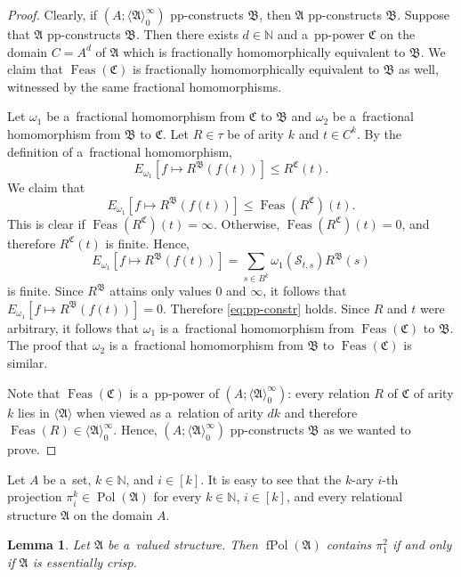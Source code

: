 \documentclass[preprint,12pt]{elsarticle}
\newcommand{\N}{\mathbb N}
\newcommand{\bA}{{\mathfrak A}}
\newcommand{\bB}{{\mathfrak B}}
\newcommand{\bC}{{\mathfrak C}}
\DeclareMathOperator{\fPol}{fPol}
\DeclareMathOperator{\Pol}{Pol}
\DeclareMathOperator{\Feas}{Feas}
\newtheorem{lemma}[theorem]{Lemma}
\begin{document}
\begin{proof}
Clearly, if $(A; \langle \bA \rangle_0^\infty)$ pp-constructs $\bB$, then $\bA$ pp-constructs $\bB$. Suppose that $\bA$ pp-constructs $\bB$. Then there exists $d\in \N$ and a~pp-power $\bC$ on the domain $C=A^d$ of $\bA$ which is fractionally homomorphically equivalent to $\bB$. We claim that $\Feas(\bC)$ is fractionally homomorphically equivalent to $\bB$ as well, witnessed by the same fractional homomorphisms.

Let $\omega_1$ be a~fractional homomorphism from $\bC$ to $\bB$ and $\omega_2$ be a~fractional homomorphism from $\bB$ to $\bC$. Let $R \in \tau$ be of arity $k$ and $t \in C^k$. By the definition of a~fractional homomorphism,
\[E_{\omega_1}[f \mapsto R^{\bB}(f(t))] \leq R^{\bC}(t).\]
We claim that 
\begin{equation}
E_{\omega_1}[f \mapsto R^{\bB}(f(t))] \leq \Feas(R^{\bC})(t). \label{eq:pp-constr}
\end{equation}
This is clear if $\Feas(R^{\bC})(t)=\infty$. Otherwise, $\Feas(R^{\bC})(t)=0$, and therefore $R^{\bC}(t)$ is finite. Hence, 
\[E_{\omega_1}[f \mapsto R^{\bB}(f(t))] = \sum_{s \in B^k} \omega_1(\mathscr{S}_{t,s}) R^{\bB}(s)\]
is finite. 
Since $R^{\bB}$ attains only values $0$ and $\infty$, it follows that $E_{\omega_1}[f \mapsto R^{\bB}(f(t))]=0$. Therefore \eqref{eq:pp-constr} holds. Since $R$ and $t$ were arbitrary, it follows that $\omega_1$ is a~fractional homomorphism from $\Feas(\bC)$ to $\bB$. The proof that $\omega_2$ is a~fractional homomorphism from $\bB$ to $\Feas(\bC)$ is similar.

Note that $\Feas(\bC)$ is a~pp-power of $(A; \langle \bA \rangle_0^\infty)$: every relation $R$ of $\bC$ of arity $k$ lies in $\langle \bA \rangle$ when viewed as a~relation of arity $dk$ and therefore $\Feas(R) \in \langle \bA \rangle_0^\infty$. 
Hence, $(A; \langle \bA \rangle_0^\infty)$ pp-constructs $\bB$ as we wanted to prove.
\end{proof}


Let $A$ be a~set, $k\in \N$, and $i \in [k]$.
It is easy to see that the $k$-ary $i$-th projection $\pi_i^k \in \Pol(\bA)$ for every $k \in \N$, $i \in [k]$, and every relational structure $\bA$ on the domain $A$. 

\begin{lemma} \label{lem:ess-crisp}
Let $\bA$ be a~valued structure. Then $\fPol(\bA)$ contains $\pi^2_1$ if and only if 
$\bA$ is essentially crisp. 
\end{lemma} 
\end{document}
